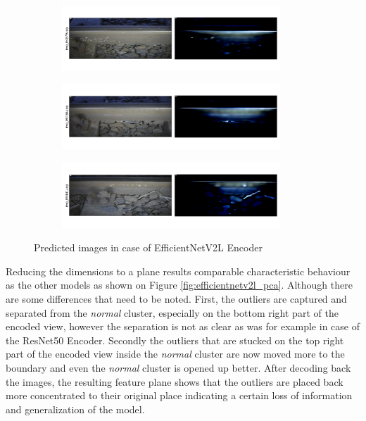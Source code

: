 \begin{figure}[!ht]
    \centering
    \begin{subfigure}{\textwidth}
        \centering
        \includegraphics[width=0.9\textwidth,trim={0 1cm 0 1cm},clip]{./results/efficientnetv2l_vgg19/20230525_194238_predict_0.png}
    \end{subfigure}
    \begin{subfigure}{\textwidth}
        \centering
        \includegraphics[width=0.9\textwidth,trim={0 1cm 0 1cm},clip]{./results/efficientnetv2l_vgg19/20230525_194238_predict_1.png}
    \end{subfigure}
    \begin{subfigure}{\textwidth}
        \centering
        \includegraphics[width=0.9\textwidth,trim={0 1cm 0 1cm},clip]{./results/efficientnetv2l_vgg19/20230525_194238_predict_2.png}
    \end{subfigure}
    \caption{Predicted images in case of EfficientNetV2L Encoder}
    \label{fig:efficientnetv2l_examples}
\end{figure}

Reducing the dimensions to a plane results comparable characteristic behaviour as the other models
as shown on Figure \ref{fig:efficientnetv2l_pca}.
Although there are some differences that need to be noted.
First, the outliers are captured and separated from the \emph{normal} cluster, especially on the
bottom right part of the encoded view, however the separation is not as clear as was for example
in case of the ResNet50 Encoder.
Secondly the outliers that are stucked on the top right part of the encoded view inside the \emph{normal}
cluster are now moved more to the boundary and even the \emph{normal} cluster is opened up better.
After decoding back the images, the resulting feature plane shows that the outliers are placed back
more concentrated to their original place indicating a certain loss of information
and generalization of the model.

